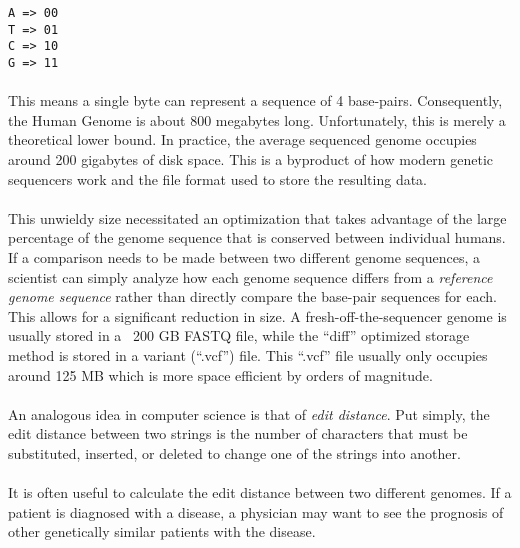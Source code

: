 \begin{verbatim}
A => 00
T => 01
C => 10
G => 11
\end{verbatim}

\paragraph{}
This means a single byte can represent a sequence of 4 base-pairs. Consequently, the Human Genome is about 800 megabytes long. Unfortunately, this is merely a theoretical lower bound. In practice, the average sequenced genome occupies around 200 gigabytes of disk space. This is a byproduct of how modern genetic sequencers work and the file format used to store the resulting data.

\paragraph{}
This unwieldy size necessitated an optimization that takes advantage of the large percentage of the genome sequence that is conserved between individual humans. If a comparison needs to be made between two different genome sequences, a scientist can simply analyze how each genome sequence differs from a \textit{reference genome sequence} rather than directly compare the base-pair sequences for each. This allows for a significant reduction in size. A fresh-off-the-sequencer genome is usually stored in a ~200 GB FASTQ file, while the ``diff'' optimized storage method is stored in a variant (``.vcf'') file. This ``.vcf'' file usually only occupies around 125 MB which is more space efficient by orders of magnitude.

\paragraph{}
An analogous idea in computer science is that of \textit{edit distance}. Put simply, the edit distance between two strings is the number of characters that must be substituted, inserted, or deleted to change one of the strings into another.

\paragraph{}
It is often useful to calculate the edit distance between two different genomes. If a patient is diagnosed with a disease, a physician may want to see the prognosis of other genetically similar patients with the disease.

